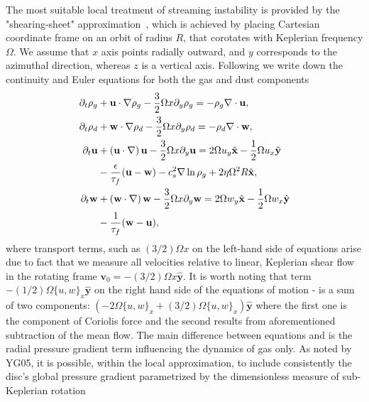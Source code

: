 The most suitable local treatment of streaming instability is provided by the
"shearing-sheet" approximation~\citep{HGB95}, which is achieved by placing
Cartesian coordinate frame on an orbit of radius $R$, that corotates with
Keplerian frequency $\Omega$.  We assume that $x$ axis points radially outward,
and $y$ corresponds to the azimuthal direction, whereas $z$ is a vertical axis.
Following \cite*{YJ07} we write down the continuity and Euler equations for both
the gas and dust components
%
\begin{align}
\partial_t \rho_g &+ \mathbf{u}\cdot\nabla\rho_g - \frac{3}{2}\Omega x\partial_y\rho_g 
 = -\rho_g\nabla\cdot\mathbf{u},\label{eqc1}\\
\partial_t \rho_d &+ \mathbf{w}\cdot\nabla\rho_d - \frac{3}{2}\Omega x\partial_y\rho_d 
 = -\rho_d\nabla\cdot\mathbf{w},\label{eqc2}\\
\partial_t \mathbf{u} &+ \left(\mathbf{u}\cdot\nabla\right)\mathbf{u} 
 - \frac{3}{2}\Omega x\partial_y\mathbf{u} 
 = 2\Omega u_y \hat{\mathbf{x}} -\frac{1}{2}\Omega u_x \hat{\mathbf{y}} \notag\\
 &- \frac{\epsilon}{\tau_f}(\mathbf{u}-\mathbf{w}) -c_s^2\nabla\ln\rho_g 
 +2\eta\Omega^2 R \hat{\mathbf{x}},\label{eqm1}\\
\partial_t \mathbf{w} &+ \left(\mathbf{w}\cdot\nabla\right)\mathbf{w} 
 - \frac{3}{2}\Omega x\partial_y\mathbf{w}
 = 2\Omega w_y \hat{\mathbf{x}} -\frac{1}{2}\Omega w_x \hat{\mathbf{y}} \notag\\
 &- \frac{1}{\tau_f}(\mathbf{w}-\mathbf{u}), \label{eqm2}
\end{align}
%
where transport terms, such as $(3/2)\Omega x$ on the left-hand side of
equations arise due to fact that we measure all velocities relative to linear,
Keplerian shear flow in the rotating frame $\mathbf{v}_0 = -(3/2)\Omega x
\hat{\mathbf{y}}$. It is worth noting that term $-(1/2)\Omega \{u,w\}_x
\hat{\mathbf{y}}$ on the right hand side of the equations of motion
- is a sum of two components: $(-2\Omega \{u,w\}_x +
(3/2)\Omega \{u,w\}_x) \hat{\mathbf{y}}$ where the first one is the component of
Coriolis force and the second results from aforementioned subtraction of the
mean flow. The main difference between equations  and  is
the radial pressure gradient term influencing  the dynamics of gas only.  As
noted by YG05, it is possible, within the local approximation,  to include
consistently the disc's global pressure gradient parametrized by the
dimensionless measure of sub-Keplerian rotation

